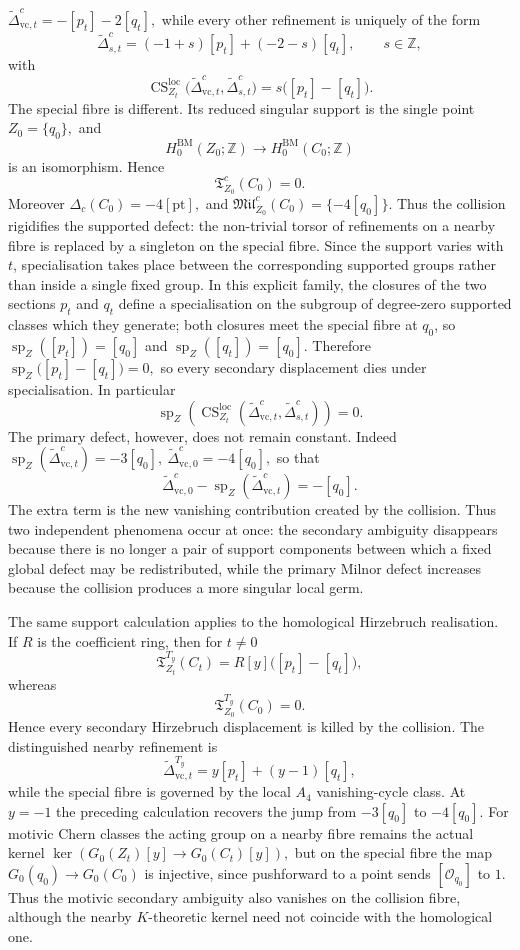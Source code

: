 \documentclass[10pt,a4paper,dvipsnames,x11names]{amsart}
\newcommand{\TLoc}{\mathfrak T}
\newcommand{\CSLoc}{\operatorname{CS}^{\mathrm{loc}}}
\numberwithin{equation}{section}
\theoremstyle{plain}
\theoremstyle{definition}
\theoremstyle{remark}
\begin{document}
$
\widetilde\Delta^c_{\mathrm{vc},t}
=-[p_t]-2[q_t],
$
while every other refinement is uniquely of the form
\[
\widetilde\Delta^c_{s,t}
=(-1+s)[p_t]+(-2-s)[q_t],
\qquad s\in\mathbb Z,
\]
with
\[
\CSLoc_{Z_t}\bigl(
\widetilde\Delta^c_{\mathrm{vc},t},
\widetilde\Delta^c_{s,t}
\bigr)
=s\bigl([p_t]-[q_t]\bigr).
\]
The special fibre is different.  Its reduced singular support is the single point $
Z_0=\{q_0\},
$
and
\[
H^{\mathrm{BM}}_0(Z_0;\mathbb Z)
\longrightarrow
H^{\mathrm{BM}}_0(C_0;\mathbb Z)
\]
is an isomorphism.  Hence
\[
\TLoc^c_{Z_0}(C_0)=0.
\]
Moreover
$
\Delta_c(C_0)=-4[\mathrm{pt}],
$ and $
\mathfrak{Mil}^c_{Z_0}(C_0)
=\{-4[q_0]\}.
$
Thus the collision rigidifies the supported defect: the non-trivial torsor of refinements on a nearby fibre is replaced by a singleton on the special fibre.
Since the support varies with $t$, specialisation takes place between the corresponding supported groups rather than inside a single fixed group.  In this explicit family, the closures of the two sections $p_t$ and $q_t$ define a specialisation on the subgroup of degree-zero supported classes which they generate; both closures meet the special fibre at $q_0$, so
$
\operatorname{sp}_Z([p_t])=[q_0] $ and $
\operatorname{sp}_Z([q_t])=[q_0].
$
Therefore
$
\operatorname{sp}_Z\bigl([p_t]-[q_t]\bigr)=0,
$
so every secondary displacement dies under specialisation.  In particular
\[
\operatorname{sp}_Z\!\left(
\CSLoc_{Z_t}(\widetilde\Delta^c_{\mathrm{vc},t},
\widetilde\Delta^c_{s,t})
\right)=0.
\]
The primary defect, however, does not remain constant.  Indeed
$
\operatorname{sp}_Z(\widetilde\Delta^c_{\mathrm{vc},t})
=-3[q_0],
\ 
\widetilde\Delta^c_{\mathrm{vc},0}
=-4[q_0],
$
so that
\[
\widetilde\Delta^c_{\mathrm{vc},0}
-
\operatorname{sp}_Z(\widetilde\Delta^c_{\mathrm{vc},t})
=-[q_0].
\]
The extra term is the new vanishing contribution created by the collision.  Thus two independent phenomena occur at once: the secondary ambiguity disappears because there is no longer a pair of support components between which a fixed global defect may be redistributed, while the primary Milnor defect increases because the collision produces a more singular local germ.

The same support calculation applies to the homological Hirzebruch realisation.  If $R$ is the coefficient ring, then for $t\neq0$
\[
\TLoc^{T_y}_{Z_t}(C_t)
=R[y]\bigl([p_t]-[q_t]\bigr),
\]
whereas
\[
\TLoc^{T_y}_{Z_0}(C_0)=0.
\]
Hence every secondary Hirzebruch displacement is killed by the collision.  The distinguished nearby refinement is
\[
\widetilde\Delta^{T_y}_{\mathrm{vc},t}
=y[p_t]+(y-1)[q_t],
\]
while the special fibre is governed by the local $A_4$ vanishing-cycle class.  At $y=-1$ the preceding calculation recovers the jump from $-3[q_0]$ to $-4[q_0]$.  For motivic Chern classes the acting group on a nearby fibre remains the actual kernel
$
\ker\!\left(
G_0(Z_t)[y]\longrightarrow G_0(C_t)[y]
\right),
$
but on the special fibre the map $G_0(q_0)\to G_0(C_0)$ is injective, since pushforward to a point sends $[\mathcal O_{q_0}]$ to $1$.  Thus the motivic secondary ambiguity also vanishes on the collision fibre, although the nearby $K$-theoretic kernel need not coincide with the homological one.
\end{document}
